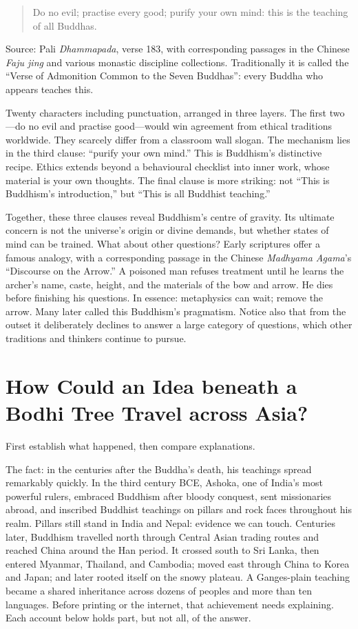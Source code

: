 \begin{quote}
Do no evil; practise every good; purify your own mind: this is the teaching of all Buddhas.
\end{quote}
Source: Pali \textit{Dhammapada}, verse 183, with corresponding passages in the Chinese \textit{Faju jing} and various monastic discipline collections. Traditionally it is called the ``Verse of Admonition Common to the Seven Buddhas'': every Buddha who appears teaches this.

Twenty characters including punctuation, arranged in three layers. The first two---do no evil and practise good---would win agreement from ethical traditions worldwide. They scarcely differ from a classroom wall slogan. The mechanism lies in the third clause: ``purify your own mind.'' This is Buddhism's distinctive recipe. Ethics extends beyond a behavioural checklist into inner work, whose material is your own thoughts. The final clause is more striking: not ``This is Buddhism's introduction,'' but ``This is all Buddhist teaching.''

Together, these three clauses reveal Buddhism's centre of gravity. Its ultimate concern is not the universe's origin or divine demands, but whether states of mind can be trained. What about other questions? Early scriptures offer a famous analogy, with a corresponding passage in the Chinese \textit{Madhyama Agama}'s ``Discourse on the Arrow.'' A poisoned man refuses treatment until he learns the archer's name, caste, height, and the materials of the bow and arrow. He dies before finishing his questions. In essence: metaphysics can wait; remove the arrow. Many later called this Buddhism's pragmatism. Notice also that from the outset it deliberately declines to answer a large category of questions, which other traditions and thinkers continue to pursue.

\section[How One Idea Travelled across Asia]{How Could an Idea beneath a Bodhi Tree Travel across Asia?}
First establish what happened, then compare explanations.

The fact: in the centuries after the Buddha's death, his teachings spread remarkably quickly. In the third century BCE, Ashoka, one of India's most powerful rulers, embraced Buddhism after bloody conquest, sent missionaries abroad, and inscribed Buddhist teachings on pillars and rock faces throughout his realm. Pillars still stand in India and Nepal: evidence we can touch. Centuries later, Buddhism travelled north through Central Asian trading routes and reached China around the Han period. It crossed south to Sri Lanka, then entered Myanmar, Thailand, and Cambodia; moved east through China to Korea and Japan; and later rooted itself on the snowy plateau. A Ganges-plain teaching became a shared inheritance across dozens of peoples and more than ten languages. Before printing or the internet, that achievement needs explaining. Each account below holds part, but not all, of the answer.


